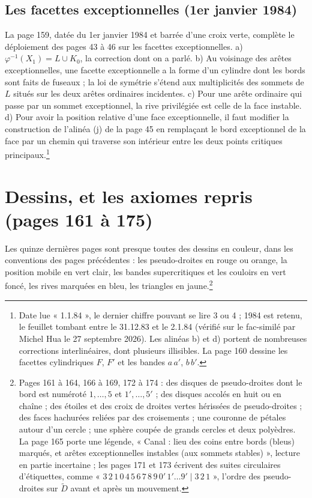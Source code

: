 \documentclass[11pt,a4paper]{article}
\begin{document}
\subsection*{Les facettes exceptionnelles (1er janvier 1984)}

La page 159, datée du 1er janvier 1984 et barrée d'une croix verte, complète le
déploiement des pages 43 à 46 sur les facettes exceptionnelles. a) $\varphi^{-1}(X_1)
= L \cup K_0$, la correction dont on a parlé. b) Au voisinage des arêtes
exceptionnelles, une facette exceptionnelle a la forme d'un cylindre dont les
bords sont faits de fuseaux ; la loi de symétrie s'étend aux multiplicités des
sommets de $L$ situés sur les deux arêtes ordinaires incidentes. c) Pour une
arête ordinaire qui passe par un sommet exceptionnel, la rive privilégiée est
celle de la face instable. d) Pour avoir la position relative d'une face
exceptionnelle, il faut modifier la construction de l'alinéa (j) de la page 45 en
remplaçant le bord exceptionnel de la face par un chemin qui traverse son
intérieur entre les deux points critiques principaux.\footnote{Date lue
« 1.1.84 », le dernier chiffre pouvant se lire 3 ou 4 ; 1984 est retenu, le
feuillet tombant entre le 31.12.83 et le 2.1.84 (vérifié sur le fac-similé par
Michel Hua le 27 septembre 2026). Les alinéas b) et d) portent de nombreuses
corrections interlinéaires, dont plusieurs illisibles. La page 160 dessine les
facettes cylindriques $F$, $F'$ et les bandes $a\,a'$, $b\,b'$.}

\section*{Dessins, et les axiomes repris (pages 161 à 175)}

Les quinze dernières pages sont presque toutes des dessins en couleur, dans les
conventions des pages précédentes : les pseudo-droites en rouge ou orange, la
position mobile en vert clair, les bandes supercritiques et les couloirs en
vert foncé, les rives marquées en bleu, les triangles en jaune.\footnote{Pages
161 à 164, 166 à 169, 172 à 174 : des disques de pseudo-droites dont le bord est
numéroté $1, \ldots, 5$ et $1', \ldots, 5'$ ; des disques accolés en huit ou en
chaîne ; des étoiles et des croix de droites vertes hérissées de pseudo-droites ;
des faces hachurées reliées par des croisements ; une couronne de pétales autour
d'un cercle ; une sphère coupée de grands cercles et deux polyèdres. La page 165
porte une légende, « Canal : lieu des coins entre bords (bleus) marqués, et
arêtes exceptionnelles instables (aux sommets stables) », lecture en partie
incertaine ; les pages 171 et 173 écrivent des suites circulaires d'étiquettes,
comme « $3\,2\,1\,0\,4\,5\,6\,7\,8\,9\,0'\,1' \ldots 9' \mid 3\,2\,1$ », l'ordre
des pseudo-droites sur $\widetilde{D}$ avant et après un mouvement.}
\end{document}
